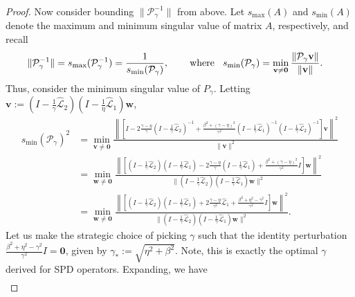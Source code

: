 \documentclass[a4paper,10pt]{article}
\begin{document}
\begin{proof}
Now consider bounding $\|\mathcal{P}_\gamma^{-1}\|$ from above. Let $s_{\max}(A)$
and $s_{\min}(A)$ denote the maximum and minimum singular value of matrix $A$,
respectively, and recall
%
\begin{align}\label{eq:sing_vals}
\|\mathcal{P}_\gamma^{-1}\| = s_{\max}(\mathcal{P}_\gamma^{-1})
	& = \frac{1}{s_{\min}(\mathcal{P}_\gamma)}, \hspace{5ex}\textnormal{where}\hspace{2ex}
s_{\min}(\mathcal{P}_\gamma) =
	\min_{\mathbf{v}\neq\mathbf{0}} \frac{\|\mathcal{P}_\gamma\mathbf{v}\|}{\|\mathbf{v}\|}.
\end{align}
%
Thus, consider the minimum singular value of $P_\gamma$. Letting $\mathbf{v} :=
(I - \tfrac{1}{\gamma}\widehat{\mathcal{L}}_2)(I - \tfrac{1}{\eta}\widehat{\mathcal{L}}_1)\mathbf{w}$,
%
\begin{align}\nonumber
s_{\min}(\mathcal{P}_\gamma)^2 & = \min_{\mathbf{v}\neq\mathbf{0}}
	\frac{\left\| \left[I - 2\frac{\gamma - \eta}{\gamma}
	( I- \tfrac{1}{\gamma}\widehat{\mathcal{L}}_2)^{-1} + 
	\frac{\beta^2 + (\gamma-\eta)^2}{\gamma^2}( I- \tfrac{1}{\gamma}\widehat{\mathcal{L}}_1)^{-1}
	( I- \tfrac{1}{\gamma}\widehat{\mathcal{L}}_2)^{-1}\right]\mathbf{v} \right\|^2}
	{\|\mathbf{v}\|^2} \\
& = \min_{\mathbf{w}\neq\mathbf{0}}
	\frac{\left\| \left[(I - \tfrac{1}{\gamma}\widehat{\mathcal{L}}_2)(I - \tfrac{1}{\gamma}\widehat{\mathcal{L}}_1)
		- 2\frac{\gamma-\eta}{\gamma}(I - \tfrac{1}{\gamma} \widehat{\mathcal{L}}_1) +
		\frac{\beta^2 + (\gamma-\eta)^2}{\gamma^2} I\right]\mathbf{w} \right\|^2}
	{\|(I - \tfrac{1}{\gamma}\widehat{\mathcal{L}}_2)(I - \tfrac{1}{\gamma}\widehat{\mathcal{L}}_1)\mathbf{w}\|^2} \nonumber\\
& = \min_{\mathbf{w}\neq\mathbf{0}}
	\frac{\left\| \left[(I - \tfrac{1}{\gamma}\widehat{\mathcal{L}}_2)(I - \tfrac{1}{\gamma}\widehat{\mathcal{L}}_1)
		+ 2\frac{\gamma-\eta}{\gamma^2}\widehat{\mathcal{L}}_1 +
		\frac{\beta^2+\eta^2 - \gamma^2}{\gamma^2} I\right]\mathbf{w} \right\|^2}
	{\|(I - \tfrac{1}{\gamma}\widehat{\mathcal{L}}_2)(I - \tfrac{1}{\gamma}\widehat{\mathcal{L}}_1)\mathbf{w}\|^2}.
	\nonumber
\end{align}
%
Let us make the strategic choice of picking $\gamma$ such that the identity perturbation
$\tfrac{\beta^2+\eta^2 - \gamma^2}{\gamma^2} I = \mathbf{0}$, given by $\gamma_*
:= \sqrt{\eta^2+\beta^2}$. Note, this is exactly the optimal $\gamma$ derived 
for SPD operators. Expanding, we have
%
{\small
\begin{align}

\end{align}}
\end{proof}
\end{document}
